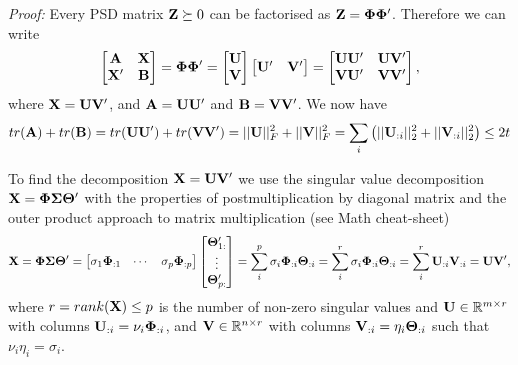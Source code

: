 \begin{small}
\emph{Proof:} Every PSD matrix $\mathbf{Z} \succeq 0$ can be factorised as $\mathbf{Z} = \mathbf{\Phi} \mathbf{\Phi}'$. 
Therefore we can write
\begin{equation}\label{eq:ProofNuclearPSD}
 \begin{bmatrix}
  \mathbf{A} & \mathbf{X} \\
  \mathbf{X'} & \mathbf{B}
 \end{bmatrix}
 = \mathbf{\Phi} \mathbf{\Phi}' = 
 \begin{bmatrix}
  \mathbf{U} \\ \mathbf{V}
 \end{bmatrix}
 \begin{bmatrix}
  \mathbf{U}' & \mathbf{V}'
 \end{bmatrix} =
 \begin{bmatrix}
  \mathbf{UU'} & \mathbf{UV'} \\
  \mathbf{VU'} & \mathbf{VV'}
 \end{bmatrix},
\end{equation}
where $\mathbf{X} = \mathbf{UV'}$, and $\mathbf{A} = \mathbf{UU'}$ and $\mathbf{B} = \mathbf{VV'}$.
We now have
\begin{equation}\label{eq:ProofNuclearTrace}
 tr(\mathbf{A}) + tr(\mathbf{B}) = tr(\mathbf{UU'}) + tr(\mathbf{VV'}) = ||\mathbf{U}||_F^2 + ||\mathbf{V}||_F^2 = \sum_i \big( ||\mathbf{U}_{:i}||_2^2 + ||\mathbf{V}_{:i}||_2^2 \big) \le 2t
\end{equation}

To find the decomposition $\mathbf{X} = \mathbf{UV'}$ we use the singular value decomposition $\mathbf{X} = \mathbf{\Phi \Sigma \Theta'}$ with the properties of postmultiplication by diagonal matrix and the outer product approach to matrix multiplication (see Math cheat-sheet)
\begin{equation}\label{eq:ProofNuclearSVD}
 \mathbf{X} = \mathbf{\Phi \Sigma \Theta'} = 
\begin{bmatrix}
 \sigma_1 \mathbf{\Phi}_{:1} & 
 \cdots &
 \sigma_p \mathbf{\Phi}_{:p}
\end{bmatrix}
\begin{bmatrix}
\mathbf{\Theta}'_{1:} \\
\vdots \\
\mathbf{\Theta}'_{p:}
\end{bmatrix} =
\sum_i^p \sigma_i \mathbf{\Phi}_{:i} \mathbf{\Theta}_{:i}
= \sum_i^r \sigma_i \mathbf{\Phi}_{:i} \mathbf{\Theta}_{:i}
= \sum_i^r \mathbf{U}_{:i} \mathbf{V}_{:i} = \mathbf{U} \mathbf{V}',
\end{equation}
where $r = rank(\mathbf{X}) \leq p$ is the number of non-zero singular values and $\mathbf{U} \in \mathbb{R}^{m \times r}$ with columns $\mathbf{U}_{:i} = \nu_i \mathbf{\Phi}_{:i}$, and $\mathbf{V} \in \mathbb{R}^{n \times r}$ with columns $\mathbf{V}_{:i} = \eta_i \mathbf{\Theta}_{:i}$
such that $\nu_i \eta_i = \sigma_i$.


\end{small}
